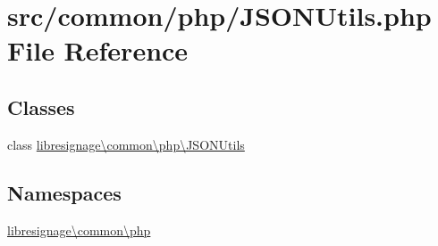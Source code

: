 \hypertarget{JSONUtils_8php}{}\section{src/common/php/\+J\+S\+O\+N\+Utils.php File Reference}
\label{JSONUtils_8php}
\subsection*{Classes}
\begin{DoxyCompactItemize}
\item 
class \hyperlink{classlibresignage_1_1common_1_1php_1_1JSONUtils}{libresignage\textbackslash{}common\textbackslash{}php\textbackslash{}\+J\+S\+O\+N\+Utils}
\end{DoxyCompactItemize}
\subsection*{Namespaces}
\begin{DoxyCompactItemize}
\item 
 \hyperlink{namespacelibresignage_1_1common_1_1php}{libresignage\textbackslash{}common\textbackslash{}php}
\end{DoxyCompactItemize}
